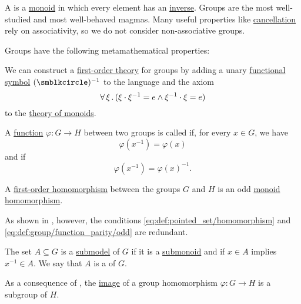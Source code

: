 \begin{definition}\label{def:group}
  A  is a \hyperref[def:monoid]{monoid} in which every element has an \hyperref[def:monoid_inverse]{inverse}. Groups are the most well-studied and most well-behaved magmas. Many useful properties like \hyperref[thm:def:group/properties/cancellative]{cancellation} rely on associativity, so we do not consider non-associative groups.

  Groups have the following metamathematical properties:
  \begin{thmenum}
     We can construct a \hyperref[def:first_order_theory]{first-order theory} for groups by adding a unary \hyperref[def:first_order_language/func]{functional symbol} \( (\anon)^{-1} \) to the language and the axiom
    \begin{equation}\label{eq:def:group/theory/inverse_axiom}
      \forall \thinspace \xi \thinspace . \thinspace (\xi \cdot \xi^{-1} = e \wedge \xi^{-1} \cdot \xi = e)
    \end{equation}
    to the \hyperref[def:monoid/theory]{theory of monoids}.

     A \hyperref[def:function]{function} \( \varphi: G \to H \) between two groups is called  if, for every \( x \in G \), we have
    \begin{equation}\label{eq:def:group/function_parity/even}
      \varphi(x^{-1}) = \varphi(x)
    \end{equation}
    and  if
    \begin{equation}\label{eq:def:group/function_parity/odd}
      \varphi(x^{-1}) = \varphi(x)^{-1}.
    \end{equation}

     A \hyperref[def:first_order_homomorphism]{first-order homomorphism} between the groups \( G \) and \( H \) is an odd \hyperref[def:monoid/homomorphism]{monoid homomorphism}.

    As shown in , however, the conditions \eqref{eq:def:pointed_set/homomorphism} and \eqref{eq:def:group/function_parity/odd} are redundant.

     The set \( A \subseteq G \) is a \hyperref[thm:substructure_is_model]{submodel} of \( G \) if it is a \hyperref[def:monoid/submodel]{submonoid} and if \( x \in A \) implies \( x^{-1} \in A \). We say that \( A \) is a  of \( G \).

    As a consequence of , the \hyperref[def:multi_valued_function/image]{image} of a group homomorphism \( \varphi: G \to H \) is a subgroup of \( H \).


\end{thmenum}
\end{definition}

